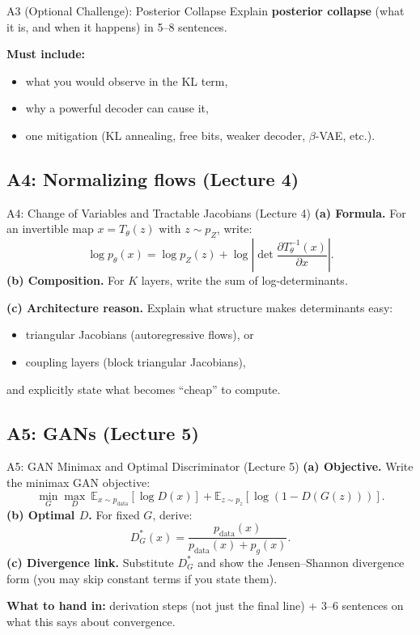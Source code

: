 \documentclass[aspectratio=169]{beamer}
\begin{document}
\begin{frame}{A3 (Optional Challenge): Posterior Collapse}
\small
Explain \textbf{posterior collapse} (what it is, and when it happens) in 5--8 sentences.
\vspace{0.4em}

\textbf{Must include:}
\begin{itemize}
  \item what you would observe in the KL term,
  \item why a powerful decoder can cause it,
  \item one mitigation (KL annealing, free bits, weaker decoder, $\beta$-VAE, etc.).
\end{itemize}
\end{frame}

\subsection{A4: Normalizing flows (Lecture 4)}

\begin{frame}{A4: Change of Variables and Tractable Jacobians (Lecture 4)}
\small
\textbf{(a) Formula.} For an invertible map $x=T_\theta(z)$ with $z\sim p_Z$, write:
\[
\log p_\theta(x)=\log p_Z(z)+\log\left|\det \frac{\partial T_\theta^{-1}(x)}{\partial x}\right|.
\]
\textbf{(b) Composition.} For $K$ layers, write the sum of log-determinants.
\vspace{0.5em}

\textbf{(c) Architecture reason.} Explain what structure makes determinants easy:
\begin{itemize}
  \item triangular Jacobians (autoregressive flows), or
  \item coupling layers (block triangular Jacobians),
\end{itemize}
and explicitly state what becomes ``cheap'' to compute.
\end{frame}

\subsection{A5: GANs (Lecture 5)}

\begin{frame}{A5: GAN Minimax and Optimal Discriminator (Lecture 5)}
\small
\textbf{(a) Objective.} Write the minimax GAN objective:
\[
\min_G \max_D\ \mathbb{E}_{x\sim p_{\text{data}}}[\log D(x)]+\mathbb{E}_{z\sim p_z}[\log(1-D(G(z)))].
\]
\textbf{(b) Optimal $D$.} For fixed $G$, derive:
\[
D_G^*(x)=\frac{p_{\text{data}}(x)}{p_{\text{data}}(x)+p_g(x)}.
\]
\textbf{(c) Divergence link.} Substitute $D^*_G$ and show the Jensen--Shannon divergence form (you may skip constant terms if you state them).
\vspace{0.4em}

\textbf{What to hand in:} derivation steps (not just the final line) + 3--6 sentences on what this says about convergence.
\end{frame}
\end{document}
